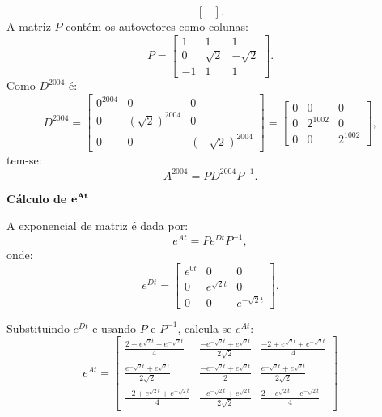 \begin{resolution}
\[\begin{bmatrix}
    \end{bmatrix}.
  \]
  A matriz \( P \) contém os autovetores como colunas:
  \[
    P = \begin{bmatrix}
      1  & 1        & 1         \\
      0  & \sqrt{2} & -\sqrt{2} \\
      -1 & 1        & 1
    \end{bmatrix}.
  \]
  Como \( D^{2004} \) é:
  \[
    D^{2004} = \begin{bmatrix}
      0^{2004} & 0                 & 0                  \\
      0        & (\sqrt{2})^{2004} & 0                  \\
      0        & 0                 & (-\sqrt{2})^{2004}
    \end{bmatrix}
    = \begin{bmatrix}
      0 & 0        & 0        \\
      0 & 2^{1002} & 0        \\
      0 & 0        & 2^{1002}
    \end{bmatrix},
  \]
  tem-se:
  \[
    A^{2004} = P D^{2004} P^{-1}.
  \]

  {\bf Cálculo de \(\bf e^{At} \)}

  A exponencial de matriz é dada por:
  \[
    e^{At} = P e^{Dt} P^{-1},
  \]
  onde:
  \[
    e^{Dt} = \begin{bmatrix}
      e^{0t} & 0             & 0              \\
      0      & e^{\sqrt{2}t} & 0              \\
      0      & 0             & e^{-\sqrt{2}t}
    \end{bmatrix}.
  \]

  Substituindo \( e^{Dt} \) e usando \( P \) e \( P^{-1} \), calcula-se \( e^{At} \):
  \begin{equation*}
    e^{At} = \begin{bmatrix}\frac{2+e^{\sqrt{2}t}+e^{-\sqrt{2}t}}{4}&\frac{-e^{-\sqrt{2}t}+e^{\sqrt{2}t}}{2\sqrt{2}}&\frac{-2+e^{\sqrt{2}t}+e^{-\sqrt{2}t}}{4}\\[16pt] \frac{e^{-\sqrt{2}t}+e^{\sqrt{2}t}}{2\sqrt{2}}&\frac{-e^{-\sqrt{2}t}+e^{\sqrt{2}t}}{2}&\frac{e^{-\sqrt{2}t}+e^{\sqrt{2}t}}{2\sqrt{2}}\\[16pt] \frac{-2+e^{\sqrt{2}t}+e^{-\sqrt{2}t}}{4}&\frac{-e^{-\sqrt{2}t}+e^{\sqrt{2}t}}{2\sqrt{2}}&\frac{2+e^{\sqrt{2}t}+e^{-\sqrt{2}t}}{4}\end{bmatrix}
  \end{equation*}
\end{resolution}

